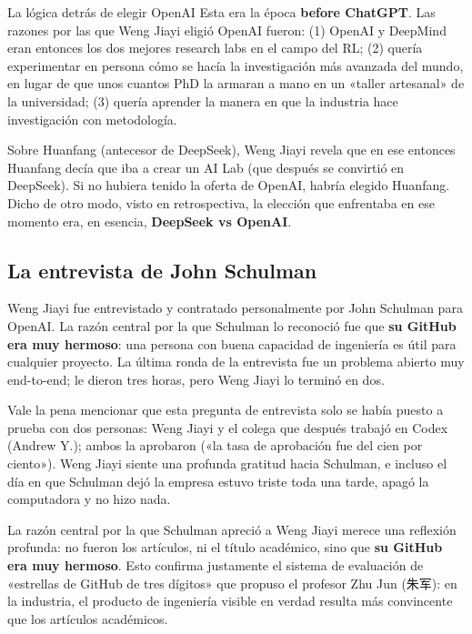 \documentclass[a4paper]{article}
\begin{document}
\begin{importantbox}{La lógica detrás de elegir OpenAI}
Esta era la época \textbf{before ChatGPT}. Las razones por las que Weng Jiayi eligió OpenAI fueron: (1) OpenAI y DeepMind eran entonces los dos mejores research labs en el campo del RL; (2) quería experimentar en persona cómo se hacía la investigación más avanzada del mundo, en lugar de que unos cuantos PhD la armaran a mano en un «taller artesanal» de la universidad; (3) quería aprender la manera en que la industria hace investigación con metodología.
\end{importantbox}

Sobre Huanfang (antecesor de DeepSeek), Weng Jiayi revela que en ese entonces Huanfang decía que iba a crear un AI Lab (que después se convirtió en DeepSeek). Si no hubiera tenido la oferta de OpenAI, habría elegido Huanfang. Dicho de otro modo, visto en retrospectiva, la elección que enfrentaba en ese momento era, en esencia, \textbf{DeepSeek vs OpenAI}.

\subsection{La entrevista de John Schulman}

Weng Jiayi fue entrevistado y contratado personalmente por John Schulman para OpenAI. La razón central por la que Schulman lo reconoció fue que \textbf{su GitHub era muy hermoso}: una persona con buena capacidad de ingeniería es útil para cualquier proyecto. La última ronda de la entrevista fue un problema abierto muy end-to-end; le dieron tres horas, pero Weng Jiayi lo terminó en dos.

Vale la pena mencionar que esta pregunta de entrevista solo se había puesto a prueba con dos personas: Weng Jiayi y el colega que después trabajó en Codex (Andrew Y.); ambos la aprobaron («la tasa de aprobación fue del cien por ciento»). Weng Jiayi siente una profunda gratitud hacia Schulman, e incluso el día en que Schulman dejó la empresa estuvo triste toda una tarde, apagó la computadora y no hizo nada.

La razón central por la que Schulman apreció a Weng Jiayi merece una reflexión profunda: no fueron los artículos, ni el título académico, sino que \textbf{su GitHub era muy hermoso}. Esto confirma justamente el sistema de evaluación de «estrellas de GitHub de tres dígitos» que propuso el profesor Zhu Jun (朱军): en la industria, el producto de ingeniería visible en verdad resulta más convincente que los artículos académicos.
\end{document}
